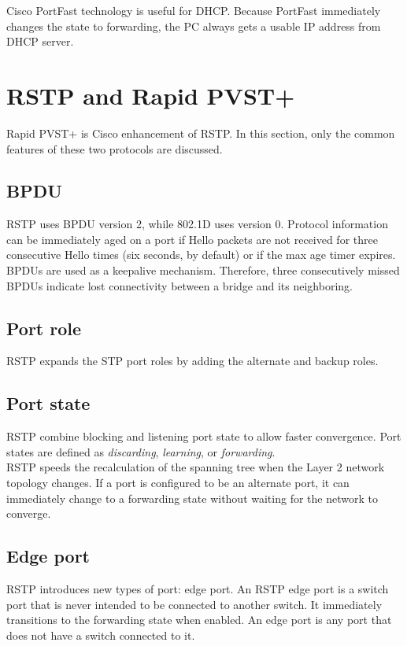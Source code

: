 Cisco PortFast technology is useful for DHCP. Because PortFast immediately changes the state to forwarding, the PC always gets a usable IP address from DHCP server.


\section{RSTP and Rapid PVST+}

Rapid PVST+ is Cisco enhancement of RSTP. In this section, only the common features of these two protocols are discussed.

\subsection{BPDU}
RSTP uses BPDU version 2, while 802.1D uses version 0. Protocol information can be immediately aged on a port if Hello packets are not received for three consecutive Hello times (six seconds, by default) or if the max age timer expires. BPDUs are used as a keepalive mechanism. Therefore, three consecutively missed BPDUs indicate lost connectivity between a bridge and its neighboring.

\subsection{Port role}

RSTP expands the STP port roles by adding the alternate and backup roles.

\subsection{Port state}
RSTP combine blocking and listening port state to allow faster convergence. Port states are defined as \emph{discarding}, \emph{learning}, or \emph{forwarding}.\\

RSTP speeds the recalculation of the spanning tree when the Layer 2 network topology changes. If a port is configured to be an alternate port, it can immediately change to a forwarding state without waiting for the network to converge.\\

\subsection{Edge port}
RSTP introduces new types of port: edge port. An RSTP edge port is a switch port that is never intended to be connected to another switch. It immediately transitions to the forwarding state when enabled. An edge port is any port that does not have a switch connected to it.

